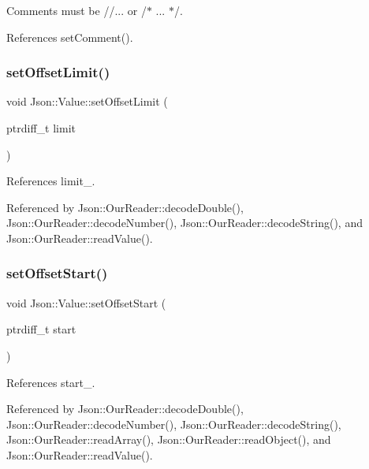 Comments must be //... or /$\ast$ ... $\ast$/. 



References set\+Comment().

\mbox{\label{classJson_1_1Value_a5e4f5853fec138150c5df6004a8c2bcf_a5e4f5853fec138150c5df6004a8c2bcf}} 
\subsubsection{\texorpdfstring{set\+Offset\+Limit()}{setOffsetLimit()}}
{\footnotesize\ttfamily void Json\+::\+Value\+::set\+Offset\+Limit (\begin{DoxyParamCaption}\item[{ptrdiff\+\_\+t}]{limit }\end{DoxyParamCaption})}



References limit\+\_\+.



Referenced by Json\+::\+Our\+Reader\+::decode\+Double(), Json\+::\+Our\+Reader\+::decode\+Number(), Json\+::\+Our\+Reader\+::decode\+String(), and Json\+::\+Our\+Reader\+::read\+Value().

\mbox{\label{classJson_1_1Value_a92e32ea0f4f8a15853a3cf0beac9feb9_a92e32ea0f4f8a15853a3cf0beac9feb9}} 
\subsubsection{\texorpdfstring{set\+Offset\+Start()}{setOffsetStart()}}
{\footnotesize\ttfamily void Json\+::\+Value\+::set\+Offset\+Start (\begin{DoxyParamCaption}\item[{ptrdiff\+\_\+t}]{start }\end{DoxyParamCaption})}



References start\+\_\+.



Referenced by Json\+::\+Our\+Reader\+::decode\+Double(), Json\+::\+Our\+Reader\+::decode\+Number(), Json\+::\+Our\+Reader\+::decode\+String(), Json\+::\+Our\+Reader\+::read\+Array(), Json\+::\+Our\+Reader\+::read\+Object(), and Json\+::\+Our\+Reader\+::read\+Value().

